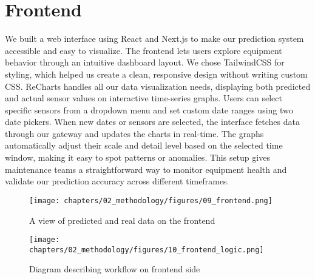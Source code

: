 \section{Frontend}
We built a web interface using React and Next.js to make our prediction system accessible and easy to visualize. The frontend lets users explore equipment behavior through an intuitive dashboard layout. We chose TailwindCSS for styling, which helped us create a clean, responsive design without writing custom CSS. ReCharts handles all our data visualization needs, displaying both predicted and actual sensor values on interactive time-series graphs. Users can select specific sensors from a dropdown menu and set custom date ranges using two date pickers. When new dates or sensors are selected, the interface fetches data through our gateway and updates the charts in real-time. The graphs automatically adjust their scale and detail level based on the selected time window, making it easy to spot patterns or anomalies. This setup gives maintenance teams a straightforward way to monitor equipment health and validate our prediction accuracy across different timeframes.

\begin{figure}[H]
    \centering
    \texttt{[image: chapters/02\_methodology/figures/09\_frontend.png]}
    \caption{A view of predicted and real data on the frontend}
    \label{fig:frontend-filters}
\end{figure}

\begin{figure}[H]
    \centering
    \texttt{[image: chapters/02\_methodology/figures/10\_frontend\_logic.png]}
    \caption{Diagram describing workflow on frontend side}
    \label{fig:frontend-logic}
\end{figure}